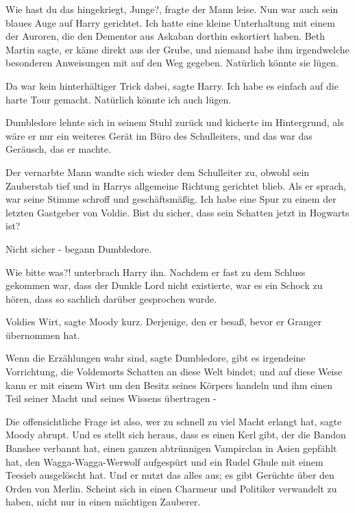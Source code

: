 \glqq{}Wie hast du das hingekriegt, Junge?\grqq{}, fragte der Mann leise. Nun war
auch sein blaues Auge auf Harry gerichtet. \glqq{}Ich hatte eine kleine
Unterhaltung mit einem der Auroren, die den Dementor aus Askaban dorthin
eskortiert haben. Beth Martin sagte, er käme direkt aus der Grube, und niemand
habe ihm irgendwelche besonderen Anweisungen mit auf den Weg gegeben. Natürlich
könnte sie lügen.\grqq{}

\glqq{}Da war kein hinterhältiger Trick dabei\grqq{}, sagte Harry. \glqq{}Ich habe
es einfach auf die harte Tour gemacht. Natürlich könnte ich auch lügen.\grqq{}

Dumbledore lehnte sich in seinem Stuhl zurück und kicherte im Hintergrund, als
wäre er nur ein weiteres Gerät im Büro des Schulleiters, und das war das
Geräusch, das er machte.

Der vernarbte Mann wandte sich wieder dem Schulleiter zu, obwohl sein Zauberstab
tief und in Harrys allgemeine Richtung gerichtet blieb. Als er sprach, war seine
Stimme schroff und geschäftsmäßig. \glqq{}Ich habe eine Spur zu einem der letzten
Gastgeber von Voldie. Bist du sicher, dass sein Schatten jetzt in Hogwarts
ist?\grqq{}

\glqq{}Nicht sicher -\grqq{} begann Dumbledore.

\glqq{}Wie bitte was?!\grqq{} unterbrach Harry ihn. Nachdem er fast zu dem
Schluss gekommen war, dass der Dunkle Lord nicht existierte, war es ein Schock
zu hören, dass so sachlich darüber gesprochen wurde.

\glqq{}Voldies Wirt\grqq{}, sagte Moody kurz. \glqq{}Derjenige, den er besaß,
bevor er Granger übernommen hat.\grqq{}

\glqq{}Wenn die Erzählungen wahr sind\grqq{}, sagte Dumbledore, \glqq{}gibt es
irgendeine Vorrichtung, die Voldemorts Schatten an diese Welt bindet; und auf
diese Weise kann er mit einem Wirt um den Besitz seines Körpers handeln und ihm
einen Teil seiner Macht und seines Wissens übertragen -\grqq{}

\glqq{}Die offensichtliche Frage ist also, wer zu schnell zu viel Macht erlangt
hat\grqq{}, sagte Moody abrupt. \glqq{}Und es stellt sich heraus, dass es einen
Kerl gibt, der die Bandon Banshee verbannt hat, einen ganzen abtrünnigen
Vampirclan in Asien gepfählt hat, den Wagga-Wagga-Werwolf aufgespürt und ein
Rudel Ghule mit einem Teesieb ausgelöscht hat. Und er nutzt das alles aus; es
gibt Gerüchte über den Orden von Merlin. Scheint sich in einen Charmeur und
Politiker verwandelt zu haben, nicht nur in einen mächtigen Zauberer.\grqq{}

